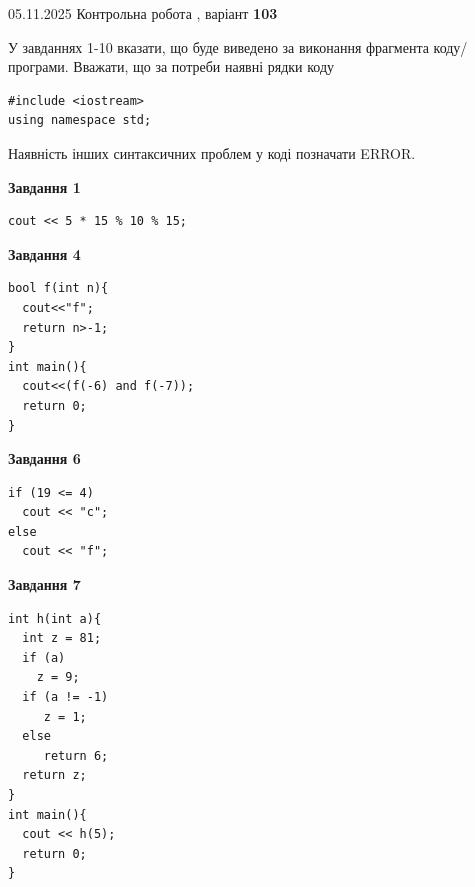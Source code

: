 \documentclass[12pt, ukrainian]{article}
\begin{document}
{\Large{05.11.2025 Контрольна робота , варіант  \No \textbf { 103 }\par}}
{
\begin {large}
У завданнях 1-10 вказати, що буде виведено за виконання фрагмента коду/про\-гра\-ми.
Вважати, що за потреби наявні рядки коду
\begin{verbatim}
#include <iostream>
using namespace std;
\end{verbatim}
Наявність інших синтаксичних проблем у коді позначати ERROR.

\begin{minipage}[t]{7.0cm}

\begin{center}
\textbf{Завдання 1}
\end{center}
\vspace{-8mm}

\begin{verbatim}
cout << 5 * 15 % 10 % 15;
\end{verbatim}



\begin{center}
\textbf{Завдання 4}
\end{center}
\vspace{-8mm}

\begin{verbatim}
bool f(int n){
  cout<<"f";
  return n>-1;
}
int main(){
  cout<<(f(-6) and f(-7));
  return 0;
}
\end{verbatim}



\begin{center}
\textbf{Завдання 6}
\end{center}
\vspace{-8mm}

\begin{verbatim}
if (19 <= 4)
  cout << "c";
else
  cout << "f";
\end{verbatim}



\begin{center}
\textbf{Завдання 7}
\end{center}
\vspace{-8mm}

\begin{verbatim}
int h(int a){
  int z = 81;
  if (a)
    z = 9;
  if (a != -1)
     z = 1;
  else
     return 6;
  return z;
}
int main(){
  cout << h(5);
  return 0;
}
\end{verbatim}


\end{minipage}
\end{large}}
\end{document}

